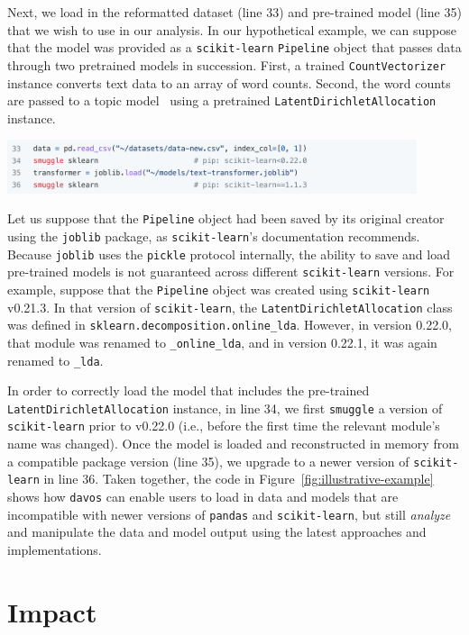 \documentclass[preprint,12pt,a4paper]{elsarticle}
\begin{document}
Next, we load in the reformatted dataset (line 33) and pre-trained
model (line 35) that we wish to use in our analysis.  In our
hypothetical example, we can suppose that the model was provided as a
\texttt{scikit-learn} \texttt{Pipeline} object that passes data
through two pretrained models in succession.  First, a trained \texttt{CountVectorizer}
instance converts text data to an array of word counts.  Second, the
word counts are passed to a topic model~\cite{BleiEtal03} using a
pretrained \texttt{LatentDirichletAllocation} instance.
\begin{center}
\includegraphics[width=0.9\textwidth]{figs/example7}
\end{center}
Let us suppose that the \texttt{Pipeline} object had been saved by its
original creator using the \texttt{joblib} package, as
\texttt{scikit-learn}'s documentation recommends.  Because
\texttt{joblib} uses the \texttt{pickle} protocol internally, the
ability to save and load pre-trained models is not guaranteed across
different \texttt{scikit-learn} versions.  For example, suppose that
the \texttt{Pipeline} object was created using \texttt{scikit-learn}
v0.21.3.  In that version of \texttt{scikit-learn}, the
\texttt{LatentDirichletAllocation} class was defined in
\texttt{sklearn.decomposition.online\_lda}.  However, in version
0.22.0, that module was renamed to \texttt{\_online\_lda}, and in
version 0.22.1, it was again renamed to \texttt{\_lda}.

In order to correctly load the model that includes the pre-trained
\texttt{LatentDirichlet\-Allocation} instance, in line 34, we first
\texttt{smuggle} a version of \texttt{scikit-learn} prior to v0.22.0 (i.e.,
before the first time the relevant module's name was changed).  Once
the model is loaded and reconstructed in memory from a compatible
package version (line 35), we upgrade to a newer version of
\texttt{scikit-learn} in line 36.  Taken together, the code in
Figure~\ref{fig:illustrative-example} shows how \texttt{davos} can
enable users to load in data and models that are incompatible with
newer versions of \texttt{pandas} and \texttt{scikit-learn}, but still
\textit{analyze} and manipulate the data and model output using the
latest approaches and implementations.


\section{Impact}
\end{document}
